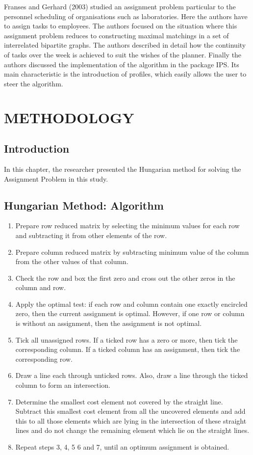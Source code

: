 \documentclass[11pt]{report}
\newcommand{\bt}[1]{\textbf{#1}}
\newcommand{\NI}{\noindent}
\renewcommand{\labelenumi}{\arabic{enumi})}
\begin{document}
	\NI Franses and Gerhard (2003) studied an assignment problem particular to the personnel scheduling of organisations such as laboratories. Here the authors have to assign tasks to employees. The authors focused on the situation where this assignment problem reduces to constructing maximal matchings in a set of interrelated bipartite graphs. The authors described in detail how the continuity of tasks over the week is achieved to suit the wishes of the planner. Finally the authors discussed the implementation of the algorithm in the package IPS. Its main characteristic is the introduction of profiles, which easily allows the user to steer the algorithm.
	

	\chapter{METHODOLOGY}
	\section{Introduction}
	In this chapter, the researcher presented the Hungarian method for solving the Assignment Problem in this study.
	
	\section{Hungarian Method: Algorithm}
	\begin{enumerate}
		\renewcommand{\labelenumi}{\bt{Step \arabic{enumi}:}}
		\item Prepare row reduced matrix by selecting the minimum values for each row and subtracting it from other elements of the row.
		\item Prepare column reduced matrix by subtracting minimum value of the column from the other values of that column.
		\item Check the row and box the first zero and cross out the other zeros in the column and row.
		\item Apply the optimal test: if each row and column contain one exactly encircled zero, then the current assignment is optimal. However, if one row or column is without an assignment, then	the assignment is not optimal.
		\item Tick all unassigned rows. If a ticked row has a zero or more, then tick the corresponding column. If a ticked column has an assignment, then tick the corresponding row.
		\item Draw a line each through unticked rows. Also, draw a line through the ticked column to form an intersection.
		\item Determine the smallest cost element not covered by the straight line. Subtract this smallest cost element from all the uncovered elements and add this to all those elements which are lying in	the intersection of these straight lines and do not change the remaining element which lie on the straight lines.
		\item Repeat steps 3, 4, 5 6 and 7, until an optimum assignment is obtained.
	\end{enumerate}
	
\end{document}
